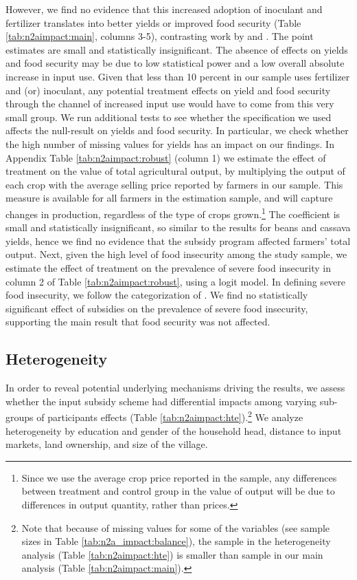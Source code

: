 However, we find no evidence that this increased adoption of inoculant and fertilizer translates into better yields or improved food security (Table \ref{tab:n2aimpact:main}, columns 3-5), contrasting work by \cite{Carter2014} and \cite{Brune2016}. The point estimates are small and statistically insignificant. The absence of effects on yields and food security may be due to low statistical power and a low overall absolute increase in input use. Given that less than 10 percent in our sample uses fertilizer and (or) inoculant, any potential treatment effects on yield and food security through the channel of increased input use would have to come from this very small group.
We run additional tests to see whether the specification we used affects the null-result on yields and food security. In particular, we check whether the high number of missing values for yields has an impact on our findings. In Appendix Table \ref{tab:n2aimpact:robust} (column 1) we estimate the effect of treatment on the value of total agricultural output, by multiplying the output of each crop with the average selling price reported by farmers in our sample. This measure is available for all farmers in the estimation sample, and will capture changes in production, regardless of the type of crops grown.\footnote{Since we use the average crop price reported in the sample, any differences between treatment and control group {}in the value of output will be due to differences in output quantity, rather than prices.} The coefficient is small and statistically insignificant, so similar to the results for beans and cassava yields, hence we find no evidence that the subsidy program affected farmers’ total output. Next, given the high level of food insecurity among the study sample, we estimate the effect of treatment on the prevalence of severe food insecurity in column 2 of Table \ref{tab:n2aimpact:robust}, using a logit model. In defining severe food insecurity, we follow the categorization of \cite{Coates2007}. We find no statistically significant effect of subsidies on the prevalence of severe food insecurity, supporting the main result that food security was not affected.



\subsection{Heterogeneity}
In order to reveal potential underlying mechanisms driving the results, we assess whether the input subsidy scheme had differential impacts among varying sub-groups of participants effects (Table \ref{tab:n2aimpact:hte}).\footnote{Note that because of missing values for some of the variables (see sample sizes in Table \ref{tab:n2a_impact:balance}), the sample in the heterogeneity analysis (Table \ref{tab:n2aimpact:hte}) is smaller than sample in our main analysis (Table \ref{tab:n2aimpact:main}).} We analyze heterogeneity by education and gender of the household head, distance to input markets, land ownership, and size of the village. 

